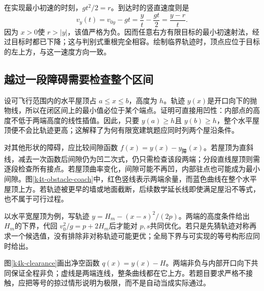 在实现最小初速的时刻，$gt^2/2=r$。到达时的竖直速度则是
\[v_y(t)=v_{0y}-gt=\frac yt-\frac{gt}{2}=\frac{y-r}{t}.\]
因为 $x>0$使 $r>|y|$，该值严格为负。因而任意右方有限目标的最小初速射法，经过目标时都已下降；这与判别式重根完全相容。绘制临界轨迹时，顶点应位于目标的左上方，与这一速度方向一致。


\subsection{越过一段障碍需要检查整个区间}
设可飞行范围内的水平屋顶占 $a\le x\le b$，高度为 $h$。轨迹 $y(x)$是开口向下的抛物线，所以在闭区间上的最小值必位于某个端点。证明可直接用凹性：内部点的高度不低于两端高度的线性插值。因此，只要 $y(a)\ge h$且 $y(b)\ge h$，整个水平屋顶便不会比轨迹更高；这解释了为何有限宽建筑题应同时列两个屋沿条件。

对其他形状的障碍，应比较间隙函数 $f(x)=y(x)-y_{\text{障}}(x)$。若屋顶为直斜线，减去一次函数后间隙仍为凹二次式，仍只需检查该段两端；分段直线屋顶则需逐段检查所有接点。若屋顶曲率变化，间隙可能不再凹，内部驻点也可能成为最小间隙。图\ref{k4t-obstacle-coach}中，红色竖线表示两端余量，而蓝色曲线在整个水平屋顶上方。若轨迹被更早的墙或地面截断，后续数学延长线即使满足屋沿不等式，也不属于可行过程。

以水平宽屋顶为例，写轨迹 $y=H_m-(x-s)^2/(2p)$。两端的高度条件给出 $H_m$的下界，代回 $v_0^2/g=p+2H_m$后才能对 $p,s$共同优化。若只是先猜轨迹对称再求一个候选值，没有排除非对称轨迹可能更优；全局下界与可实现的等号构形应同时给出。

图\ref{k4k-clearance}画出净空函数 $q(x)=y(x)-H$。两端非负与内部开口向下共同保证全程非负；虚线是两端连线，整条曲线都在它上方。若题目要求严格不接触，应把等号的掠过情形说明为极限，而不是自动当成实际通过。


